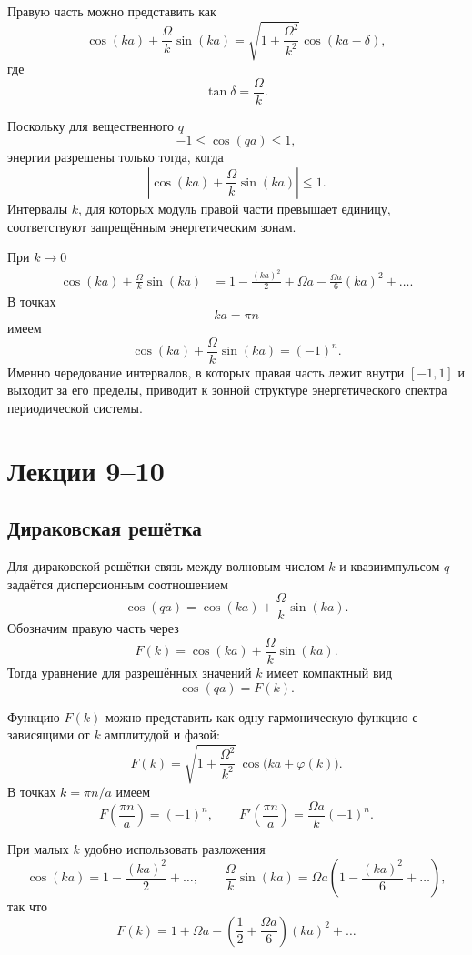 \documentclass[12pt,a4paper]{article}
\begin{document}
Правую часть можно представить как
\[
    \cos(ka)
    +
    \frac{\Omega}{k}\sin(ka)
    =
    \sqrt{
        1+\frac{\Omega^2}{k^2}
    }
    \cos(ka-\delta),
\]
где
\[
    \tan\delta=\frac{\Omega}{k}.
\]

Поскольку для вещественного $q$
\[
    -1\leq\cos(qa)\leq1,
\]
энергии разрешены только тогда, когда
\[
    \boxed{
    \left|
        \cos(ka)
        +
        \frac{\Omega}{k}\sin(ka)
    \right|
    \leq1
    }.
\]
Интервалы $k$, для которых модуль правой части превышает единицу,
соответствуют запрещённым энергетическим зонам.

При $k\to0$
\[
\begin{aligned}
    \cos(ka)
    +
    \frac{\Omega}{k}\sin(ka)
    &=
    1-\frac{(ka)^2}{2}
    +
    \Omega a
    -
    \frac{\Omega a}{6}(ka)^2
    +\ldots .
\end{aligned}
\]
В точках
\[
    ka=\pi n
\]
имеем
\[
    \cos(ka)
    +
    \frac{\Omega}{k}\sin(ka)
    =
    (-1)^n.
\]
Именно чередование интервалов, в которых правая часть лежит внутри
$[-1,1]$ и выходит за его пределы, приводит к зонной структуре
энергетического спектра периодической системы.
\section{Лекции 9--10}

\subsection{Дираковская решётка}

Для дираковской решётки связь между волновым числом $k$ и
квазиимпульсом $q$ задаётся дисперсионным соотношением
\[
    \boxed{
        \cos(qa)
        =
        \cos(ka)+\frac{\Omega}{k}\sin(ka)
    }.
\]
Обозначим правую часть через
\[
    F(k)
    =
    \cos(ka)+\frac{\Omega}{k}\sin(ka).
\]
Тогда уравнение для разрешённых значений $k$ имеет компактный вид
\[
    \cos(qa)=F(k).
\]

Функцию $F(k)$ можно представить как одну гармоническую функцию с
зависящими от $k$ амплитудой и фазой:
\[
    F(k)
    =
    \sqrt{1+\frac{\Omega^2}{k^2}}\,
    \cos\bigl(ka+\varphi(k)\bigr).
\]
В точках $k=\pi n/a$ имеем
\[
    F\left(\frac{\pi n}{a}\right)=(-1)^n,
    \qquad
    F'\left(\frac{\pi n}{a}\right)
    =
    \frac{\Omega a}{k}(-1)^n.
\]

При малых $k$ удобно использовать разложения
\[
    \cos(ka)
    =
    1-\frac{(ka)^2}{2}+\ldots,
    \qquad
    \frac{\Omega}{k}\sin(ka)
    =
    \Omega a
    \left(
        1-\frac{(ka)^2}{6}+\ldots
    \right),
\]
так что
\[
    F(k)
    =
    1+\Omega a
    -
    \left(
        \frac12+\frac{\Omega a}{6}
    \right)(ka)^2
    +\ldots
\]
\end{document}
